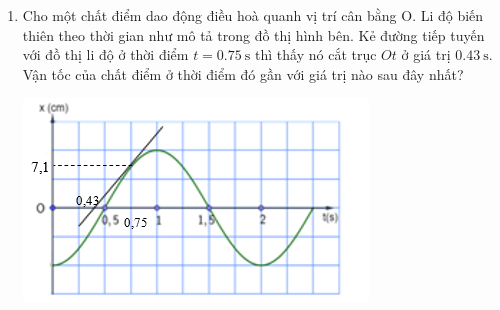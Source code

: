 \begin{enumerate}[label=\bfseries Câu \arabic*:]
\item 
{Cho một chất điểm dao động điều hoà quanh vị trí cân bằng O. Li độ biến thiên theo thời gian như mô tả trong đồ thị hình bên. Kẻ đường tiếp tuyến với đồ thị li độ ở thời điểm $t=\SI{0.75}{\second}$ thì thấy nó cắt trục $Ot$ ở giá trị $\SI{0.43}{\second}$. Vận tốc của chất điểm ở thời điểm đó gần với giá trị nào sau đây nhất?
\begin{center}
	\includegraphics[width=0.4\linewidth]{../figs/D11-1-3}
\end{center}
}
{
}


\end{enumerate}
